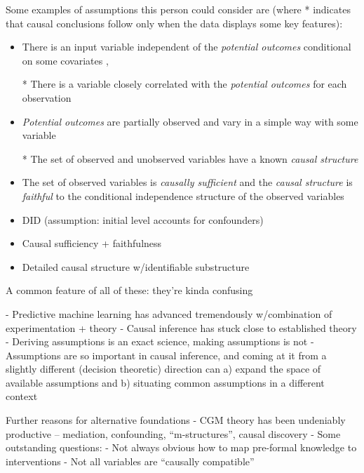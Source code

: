 Some examples of assumptions this person could consider are (where * indicates that causal conclusions follow only when the data displays some key features):
\begin{itemize}
    \item There is an input variable independent of the \emph{potential outcomes} conditional on some covariates \citep[Chap. ~12]{imbens_causal_2015}, \citep[Chaps ~2, 3, 5]{angrist_mastering_2014}
    \item [*] There is a variable closely correlated with the \emph{potential outcomes} for each observation \citep[Chap. ~21]{imbens_causal_2015}
    \item \emph{Potential outcomes} are partially observed and vary in a simple way with some variable
    \item [*] The set of observed and unobserved variables have a known \emph{causal structure}
    \item The set of observed variables is \emph{causally sufficient} and the \emph{causal structure} is \emph{faithful} to the conditional independence structure of the observed variables

    \item DID (assumption: initial level accounts for confounders)
    \item Causal sufficiency + faithfulness
    \item Detailed causal structure w/identifiable substructure
\end{itemize}

A common feature of all of these: they're kinda confusing



 - Predictive machine learning has advanced tremendously w/combination of experimentation + theory
 - Causal inference has stuck close to established theory
 - Deriving assumptions is an exact science, making assumptions is not
 - Assumptions are so important in causal inference, and coming at it from a slightly different (decision theoretic) direction can a) expand the space of available assumptions and b) situating common assumptions in a different context


 Further reasons for alternative foundations
 - CGM theory has been undeniably productive -- mediation, confounding, ``m-structures'', causal discovery
 - Some outstanding questions:
 - Not always obvious how to map pre-formal knowledge to interventions
 - Not all variables are ``causally compatible''



